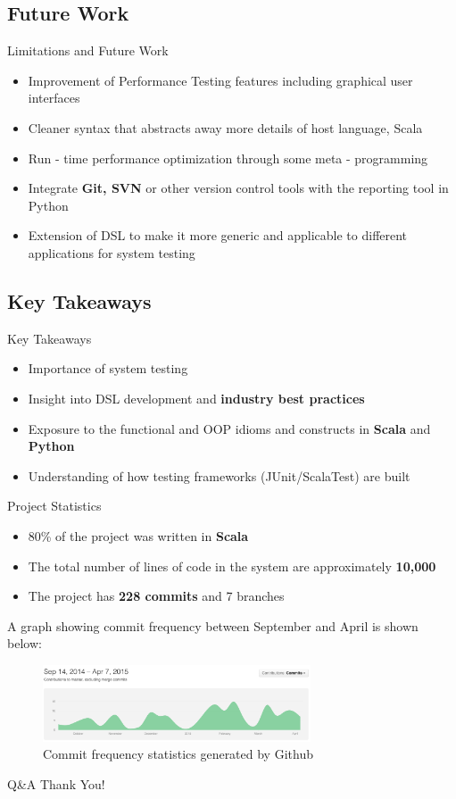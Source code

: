 \subsection{Future Work}
\begin{frame}{Limitations and Future Work}
\begin{itemize}
\item Improvement of Performance Testing features including graphical user interfaces
\item Cleaner syntax that abstracts away more details of host language, Scala
\item Run - time performance optimization through some meta - programming
\item Integrate \textbf{Git, SVN} or other version control tools with the reporting tool in Python
\item Extension of DSL to make it more generic and applicable to different applications for system testing
\end{itemize}
\end{frame}

\subsection{Key Takeaways}
\begin{frame}{Key Takeaways}
\begin{itemize}
\item Importance of system testing
\item Insight into DSL development and \textbf{industry best practices}
\item Exposure to the functional and OOP idioms and constructs in \textbf{Scala} and \textbf{Python}
\item Understanding of how testing frameworks (JUnit/ScalaTest) are built
\end{itemize}
\end{frame}

\begin{frame}{Project Statistics}
\begin{itemize}
\item 80\% of the project was written in \textbf{Scala}
\item The total number of lines of code in the system are approximately \textbf{10,000}
\item The project has \textbf{228 commits} and 7 branches
\end{itemize}
\noindent
A graph showing commit frequency between September and April is shown below:
\begin{figure}[H]
  \centering
    \includegraphics[width=300px]{figures/commit_frequency.png}
  \caption{Commit frequency statistics generated by Github}
\end{figure}
\end{frame}

\begin{frame}{Q\&A}
Thank You!
\end{frame}